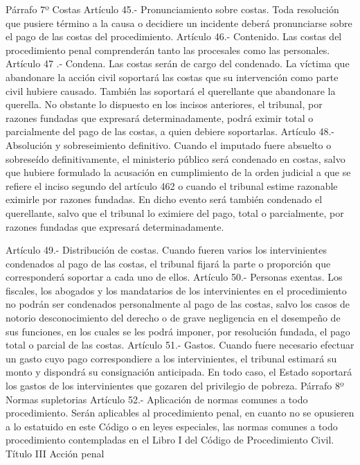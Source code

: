     Párrafo 7º Costas
    Artículo 45.- Pronunciamiento sobre costas. Toda resolución que pusiere término a la causa o decidiere un incidente deberá pronunciarse sobre el pago de las costas del procedimiento.
    Artículo 46.- Contenido. Las costas del procedimiento penal comprenderán tanto las procesales como las personales.
    Artículo 47 .- Condena. Las costas serán de cargo del condenado.
    La víctima que abandonare la acción civil soportará las costas que su intervención como parte civil hubiere causado. También las soportará el querellante que abandonare la querella.
    No obstante lo dispuesto en los incisos anteriores, el tribunal, por razones fundadas que expresará determinadamente, podrá eximir total o parcialmente del pago de las costas, a quien debiere soportarlas.
    Artículo 48.- Absolución y sobreseimiento definitivo. Cuando el imputado fuere absuelto o sobreseído definitivamente, el ministerio público será condenado en costas, salvo que hubiere formulado la acusación en cumplimiento de la orden judicial a que se refiere el inciso segundo del artículo 462 o cuando el tribunal estime razonable eximirle por razones fundadas.
    En dicho evento será también condenado el querellante, salvo que el tribunal lo eximiere del pago, total o parcialmente, por razones fundadas que expresará determinadamente.

    Artículo 49.- Distribución de costas. Cuando fueren varios los intervinientes condenados al pago de las costas, el tribunal fijará la parte o proporción que corresponderá soportar a cada uno de ellos.
    Artículo 50.- Personas exentas. Los fiscales, los abogados y los mandatarios de los intervinientes en el procedimiento no podrán ser condenados personalmente al pago de las costas, salvo los casos de notorio desconocimiento del derecho o de grave negligencia en el desempeño de sus funciones, en los cuales se les podrá imponer, por resolución fundada, el pago total o parcial de las costas.
    Artículo 51.- Gastos. Cuando fuere necesario efectuar un gasto cuyo pago correspondiere a los intervinientes, el tribunal estimará su monto y dispondrá su consignación anticipada.
    En todo caso, el Estado soportará los gastos de los intervinientes que gozaren del privilegio de pobreza.
    Párrafo 8º Normas supletorias
    Artículo 52.- Aplicación de normas comunes a todo procedimiento. Serán aplicables al procedimiento penal, en cuanto no se opusieren a lo estatuido en este Código o en leyes especiales, las normas comunes a todo procedimiento contempladas en el Libro I del Código de Procedimiento Civil.
    Título III
    Acción penal

